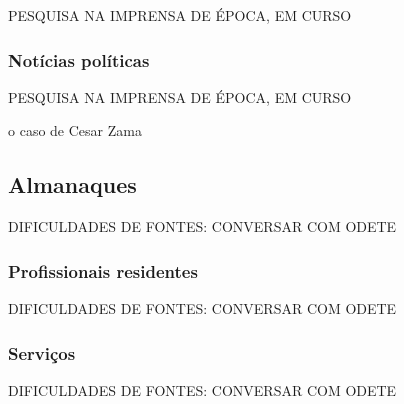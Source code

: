 PESQUISA NA IMPRENSA DE ÉPOCA, EM CURSO

\subsubsection{Notícias políticas}\label{subsubsec:2.5.1.2}

PESQUISA NA IMPRENSA DE ÉPOCA, EM CURSO

o caso de Cesar Zama

\subsection{Almanaques}\label{subsec:2.5.2}

DIFICULDADES DE FONTES: CONVERSAR COM ODETE

\subsubsection{Profissionais residentes}\label{subsubsec:2.5.2.1}

DIFICULDADES DE FONTES: CONVERSAR COM ODETE

\subsubsection{Serviços}\label{subsubsec:2.5.2.2}

DIFICULDADES DE FONTES: CONVERSAR COM ODETE